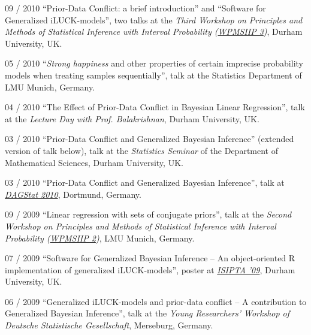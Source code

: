 \documentclass[a4paper]{simplecv}
\begin{document}
\begin{topic}
\item[09 / 2010] ``Prior-Data Conflict: a brief introduction'' and ``Software for Generalized iLUCK-models'', two talks at the
                 \emph{Third Workshop on Principles and Methods of Statistical Inference with Interval Probability (\href{http://www.maths.dur.ac.uk/users/matthias.troffaes/wpmsiip2010/}{WPMSIIP 3})},
                 Durham University, UK.

\item[05 / 2010] ``\emph{Strong happiness} and other properties of certain imprecise probability models when treating samples sequentially'',
                 talk at the Statistics Department of LMU Munich, Germany.

\item[04 / 2010] ``The Effect of Prior-Data Conflict in Bayesian Linear Regression'', talk at the
                 \emph{Lecture Day with Prof. Balakrishnan}, Durham University, UK.

\item[03 / 2010] ``Prior-Data Conflict and Generalized Bayesian Inference'' (extended version of talk below), talk at the
                 \emph{Statistics Seminar} of the Department of Mathematical Sciences, Durham University, UK.

\item[03 / 2010] ``Prior-Data Conflict and Generalized Bayesian Inference'', talk at
                 \emph{\href{http://www.statistik.tu-dortmund.de/DAGStat2010/en/index.html}{DAGStat 2010}}, Dortmund, Germany.

\item[09 / 2009] ``Linear regression with sets of conjugate priors'', talk at the
                 \emph{Second Workshop on Principles and Methods of Statistical Inference with Interval Probability (\href{http://www.stat.uni-muenchen.de/~walter/workshop0909/}{WPMSIIP 2})}, LMU Munich, Germany.

\item[07 / 2009] ``Software for Generalized Bayesian Inference -- An object-oriented \textsf{R} implementation of generalized iLUCK-models'', poster at
                 \emph{\href{http://www.sipta.org/isipta09/}{ISIPTA '09}}, Durham University, UK.

\item[06 / 2009] ``Generalized iLUCK-models and prior-data conflict -- A contribution to Generalized Bayesian Inference'', talk at the
                 \emph{Young Researchers' Workshop of Deutsche Statistische Gesellschaft}, Merseburg, Germany.


\end{topic}
\end{document}
